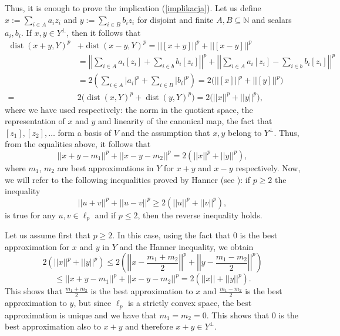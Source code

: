 \documentclass[12pt, reqno]{amsart}
\theoremstyle{definition}
\theoremstyle{remark}
\numberwithin{equation}{section}
\DeclareMathOperator{\dist}{dist}
\begin{document}
Thus, it is enough to prove the implication (\ref{implikacja}).
Let us define $x:= \sum_{i \in A}a_i z_i$ and $y:=\sum_{i \in B} b_iz_i$ for disjoint and finite $A, B \subseteq \mathbb{N}$ and scalars $a_i, b_i$. If $x, y \in Y^{\perp}$, then it follows that
\begin{align*}
\dist(x+y, Y)^p &+ \dist(x-y, Y)^p = ||[x+y]||^p + ||[x-y]||^p\\
&=\left | \left | \sum_{i \in A}a_i [z_i] + \sum_{i \in b}b_i [z_i]\right | \right |^p + \left | \left |\sum_{i \in A}a_i [z_i] - \sum_{i \in b}b_i [z_i]\right |\right |^p\\
&= 2 \left ( \sum_{i \in A} |a_i|^p + \sum_{i \in B} |b_i|^p \right )=2\big(||[x]||^p + ||[y]||^p\big)\\
=& 2\big(\dist(x, Y)^p + \dist(y, Y)^p\big) = 2 \big(||x||^p + ||y||^p\big),
\end{align*}
where we have used respectively: the norm in the quotient space, the representation of $x$ and $y$ and linearity of the canonical map, the fact that $[z_1],[z_2],\ldots$ form a basis of $V$ and the assumption that $x, y$ belong to $Y^{\perp}$. Thus, from the equalities above, it follows that
\begin{equation}
\label{rownosc}
||x+y-m_1||^p + ||x-y-m_2||^p = 2(||x||^p + ||y||^p),
\end{equation}
where $m_1$, $m_2$ are best approximations in $Y$ for $x+y$ and $x-y$ respectively. Now, we will refer to the following inequalities proved by Hanner (see \cite{hanner}): if $p \geq 2$ the inequality
\begin{equation}
    ||u+v||^p + ||u-v||^p \geq 2 ( ||u||^p + ||v||^p),
\end{equation}
is true for any $u, v \in \ell_p$ and if $p \leq 2$, then the reverse inequality holds.

Let us assume first that $p \geq 2$. In this case, using the fact that $0$ is the best approximation for $x$ and $y$ in $Y$ and the Hanner inequality, we obtain
$$2(||x||^p + ||y||^p) \leq 2\left ( \left | \left |x - \frac{m_1+m_2}{2} \right | \right |^p + \left | \left |y - \frac{m_1-m_2}{2}\right | \right |^p \right)$$
$$\leq ||x + y  - m_1||^p + ||x-y-m_2||^p = 2(||x|| + ||y||^p).$$
This shows that $\frac{m_1+m_2}{2}$ is the best approximation to $x$ and $\frac{m_1-m_2}{2}$ is the best approximation to $y$, but since $\ell_p$ is a  strictly convex space, the best approximation is unique and we have that $m_1=m_2=0$. This shows that $0$ is the best approximation also to $x+y$ and therefore $x+y \in Y^{\perp}$.
\end{document}
